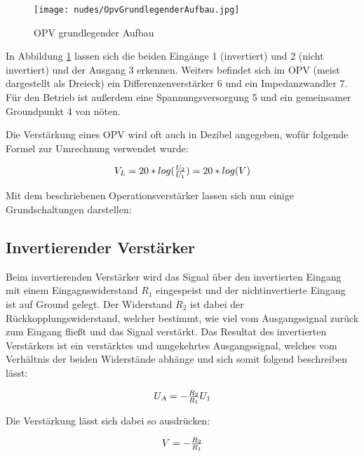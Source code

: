 \documentclass[12pt,a4paper,twoside]{article}
\begin{document}
\begin{figure}[H]
    \centering
    \texttt{[image: nudes/OpvGrundlegenderAufbau.jpg]}
    \caption{OPV grundlegender Aufbau \cite{teachcenter2}}
    \label{fig:OpvAufbau}
\end{figure}

\noindent
In Abbildung \ref{fig:OpvAufbau} lassen sich die beiden Eingänge 1 (invertiert) und 2 (nicht invertiert) und der Ausgang 3 erkennen. Weiters befindet sich im OPV (meist dargestellt als Dreieck) ein Differenzenverstärker 6 und ein Impedanzwandler 7. Für den Betrieb ist außerdem eine Spannungsversorgung 5 und ein gemeinsamer Groundpunkt 4 von nöten. \newline

\noindent
Die Verstärkung eines OPV wird oft auch in Dezibel angegeben, wofür folgende Formel zur Umrechnung verwendet wurde:

\begin{equation}
    \label{eq:VerstärkungDezibel}
    \centerline{$V_{L} = 20*log(\frac{U_{2}}{U_{1}}) = 20*log(V)$}
\end{equation}

\noindent
Mit dem beschriebenen Operationsverstärker lassen sich nun einige Grundschaltungen darstellen:

\subsection{Invertierender Verstärker}

Beim invertierenden Verstärker wird das Signal über den invertierten Eingang mit einem Eingagnswiderstand $R_{1}$ eingespeist und der nichtinvertierte Eingang ist auf Ground gelegt. Der Widerstand $R_{2}$ ist dabei der Rückkopplungswiderstand, welcher bestimmt, wie viel vom Ausgangssignal zurück zum Eingang fließt und das Signal verstärkt.
Das Resultat des invertierten Verstärkers ist ein verstärktes und umgekehrtes Ausgangssignal, welches vom Verhältnis der beiden Widerstände abhänge und sich somit folgend beschreiben lässt:

\begin{equation}
    \label{eq:InvertierenderVerstärkerAusgang}
    \centerline{$U_{A}=-\frac{R_{2}}{R_{1}}U_{1}$}
\end{equation}

\noindent
Die Verstärkung lässt sich dabei so ausdrücken:

\begin{equation}
    \label{eq:InvertierenderVerstärkerVerstärkung}
    \centerline{$V=-\frac{R_{2}}{R_{1}}$}
\end{equation}
\end{document}
